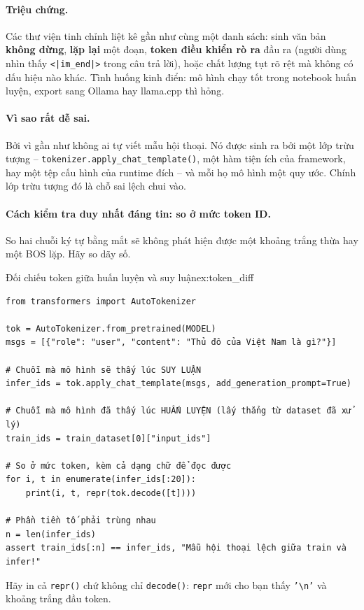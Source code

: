 \paragraph{Triệu chứng.} Các thư viện tinh chỉnh liệt kê gần như cùng một danh sách: sinh văn bản \textbf{không dừng}, \textbf{lặp lại} một đoạn, \textbf{token điều khiển rò ra} đầu ra (người dùng nhìn thấy \texttt{<|im\_end|>} trong câu trả lời), hoặc chất lượng tụt rõ rệt mà không có dấu hiệu nào khác. Tình huống kinh điển: mô hình chạy tốt trong notebook huấn luyện, export sang Ollama hay llama.cpp thì hỏng.

\paragraph{Vì sao rất dễ sai.} Bởi vì gần như không ai tự viết mẫu hội thoại. Nó được sinh ra bởi một lớp trừu tượng -- \texttt{tokenizer.\allowbreak apply\_\allowbreak chat\_\allowbreak template(\allowbreak )}, một hàm tiện ích của framework, hay một tệp cấu hình của runtime đích -- và mỗi họ mô hình một quy ước. Chính lớp trừu tượng đó là chỗ sai lệch chui vào.

\paragraph{Cách kiểm tra duy nhất đáng tin: so ở mức token ID.} So hai chuỗi ký tự bằng mắt sẽ không phát hiện được một khoảng trắng thừa hay một BOS lặp. Hãy so dãy số.

\begin{example}{Đối chiếu token giữa huấn luyện và suy luận}{ex:token_diff}
\begin{verbatim}
from transformers import AutoTokenizer

tok = AutoTokenizer.from_pretrained(MODEL)
msgs = [{"role": "user", "content": "Thủ đô của Việt Nam là gì?"}]

# Chuỗi mà mô hình sẽ thấy lúc SUY LUẬN
infer_ids = tok.apply_chat_template(msgs, add_generation_prompt=True)

# Chuỗi mà mô hình đã thấy lúc HUẤN LUYỆN (lấy thẳng từ dataset đã xử lý)
train_ids = train_dataset[0]["input_ids"]

# So ở mức token, kèm cả dạng chữ để đọc được
for i, t in enumerate(infer_ids[:20]):
    print(i, t, repr(tok.decode([t])))

# Phần tiền tố phải trùng nhau
n = len(infer_ids)
assert train_ids[:n] == infer_ids, "Mẫu hội thoại lệch giữa train và infer!"
\end{verbatim}
Hãy in cả \texttt{repr()} chứ không chỉ \texttt{decode()}: \texttt{repr} mới cho bạn thấy \texttt{'\textbackslash n'} và khoảng trắng đầu token.
\end{example}

